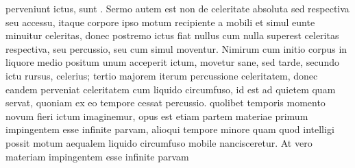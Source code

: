 \pend
\newpage
\pstart
\noindent
perveniunt ictus, sunt . 
Sermo autem est non de celeritate absoluta sed respectiva seu accessu, itaque corpore ipso motum recipiente a mobili 
et simul eunte minuitur celeritas, donec postremo ictus fiat nullus cum nulla superest celeritas respectiva, seu percussio, seu cum simul moventur. Nimirum cum initio corpus in liquore medio positum unum acceperit ictum, movetur sane, sed tarde, secundo ictu rursus, celerius; tertio majorem iterum 
percussione celeritatem, donec 
eandem perveniat celeritatem cum liquido circumfuso, id est ad quietem quam servat, quoniam ex eo tempore cessat percussio\protect{}. 
quolibet temporis momento novum fieri ictum imaginemur, opus est etiam partem materiae primum impingentem esse infinite parvam, alioqui tempore minore quam quod intelligi possit motum aequalem liquido circumfuso mobile nancisceretur. At vero materiam impingentem esse infinite parvam 
